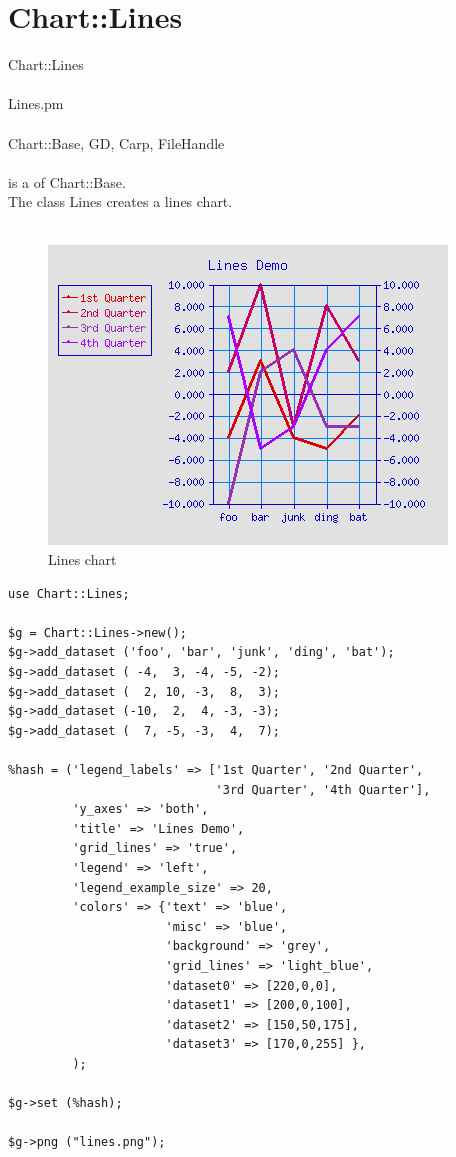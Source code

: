 \section{Chart::Lines}
 Chart::Lines\\ \\
 Lines.pm\\ \\
Chart::Base, GD, Carp, FileHandle\\ \\
  is a  of Chart::Base.\\
The class Lines creates a lines chart.\\
\\
\begin{figure}[h]
	\begin{center}
		\includegraphics[scale=0.5]{d_lines2.png}
	\end{center}
	\caption{Lines chart}
	\label{fig:lines}
\end{figure}
\begin{verbatim}
use Chart::Lines;

$g = Chart::Lines->new();
$g->add_dataset ('foo', 'bar', 'junk', 'ding', 'bat');
$g->add_dataset ( -4,  3, -4, -5, -2);
$g->add_dataset (  2, 10, -3,  8,  3);
$g->add_dataset (-10,  2,  4, -3, -3);
$g->add_dataset (  7, -5, -3,  4,  7);

%hash = ('legend_labels' => ['1st Quarter', '2nd Quarter',
                             '3rd Quarter', '4th Quarter'],
         'y_axes' => 'both',
         'title' => 'Lines Demo',
         'grid_lines' => 'true',
         'legend' => 'left',
         'legend_example_size' => 20,
         'colors' => {'text' => 'blue',
                      'misc' => 'blue',
                      'background' => 'grey',
                      'grid_lines' => 'light_blue',
                      'dataset0' => [220,0,0],
                      'dataset1' => [200,0,100],
                      'dataset2' => [150,50,175],
                      'dataset3' => [170,0,255] },
         );

$g->set (%hash);

$g->png ("lines.png");
\end{verbatim}
